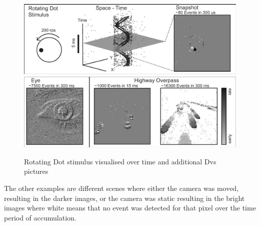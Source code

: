 \begin{figure}[htpb]
  \centering
  \includegraphics[width=\textwidth]{figures/rotatingDot}
  \newline
  \includegraphics[width=\textwidth]{figures/rotatingDotAdd}
  \caption{Rotating Dot stimulus visualised over time and additional Dvs pictures}
  \label{fig:rotatingDot}
\end{figure}
The other examples are different scenes where either the camera was moved, resulting in the darker images, or the camera was static resulting in the bright images where white means that no event was detected for that pixel over the time period of accumulation.


